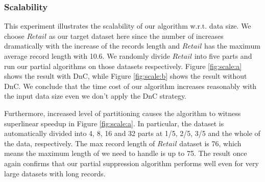 

\subsubsection{Scalability}\label{sec:eval:scale}
This experiment illustrates the scalability of our algorithm
w.r.t. data size. We choose $Retail$ as our target dataset here
since the number of \qids increases dramatically with
the increase of the records length
and $Retail$ has the maximum average record length with 10.6.
We randomly divide $Retail$ into five parts and
run our partial algorithms on those datasets respectively.
Figure \ref{fig:scale:a} shows the result with
DnC, while Figure \ref{fig:scale:b} shows the result
without DnC.
We conclude that the time cost of our
algorithm increases reasonably with the input data size even
we don't apply the DnC strategy.

Furthermore, increased level of partitioning causes the algorithm to witness
superlinear speedup in Figure \ref{fig:scale:a}. In particular, the dataset is
automatically divided into 4, 8, 16 and 32 parts at 1/5, 2/5, 3/5 and
the whole of the data, respectively.
The max record length of $Retail$ dataset is 76,
which means the maximum length of \qid we need to handle is up to 75.
The result once again confirms that our partial suppression algorithm
performs well even for very large datasets with long records.



